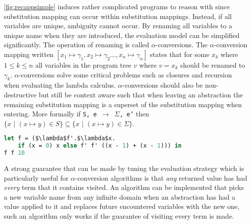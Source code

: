 \documentclass[11pt,oneside,a4paper]{report}
\begin{document}
\autoref{fig:recappsimple} induces rather complicated programs to reason with since substitution mapping can occur within substitution mappings.
Instead, if all variables are unique, ambiguity cannot occur.
By renaming all variables to a unique name when they are introduced, the evaluation model can be simplified significantly.
The operation of renaming is called $\alpha$-conversions.
The $\alpha$-conversion mapping written $[x_1 \mapsto \gamma_1, x_2 \mapsto \gamma_2 \dots , x_n \mapsto \gamma_n]$ states that for some $x_k$ where $1 \leq k \leq n$ all variables in the program tree $v$ where $v = x_k$ should be renamed to $\gamma_k$.
$\alpha$-conversions solve some critical problems such as closures and recursion when evaluating the lambda calculus.
$\alpha$-conversions should also be non-destructive but still be context aware such that when leaving an abstraction the remaining substitution mapping is a superset of the substitution mapping when entering.
More formally if \texttt{S, e $\rightarrow$ $\Sigma$, e'} then $\{x \,\,|\,\, (x \mapsto y) \in S\} \subseteq \{x \,\,|\,\, (x \mapsto y) \in \Sigma\}$.
\begin{lstlisting}[language=ML,caption={Recursive addition function},label={lst:recalpha},mathescape=true]
let f = ($\lambda$f'.$\lambda$x.
    if (x = 0) x else f' f' ((x - 1) + (x - 1))) in
f f 10
\end{lstlisting}
A strong guarantee that can be made by tuning the evaluation strategy which is particularly useful for $\alpha$-conversion algorithms is that \textit{any} returned value has had \textit{every} term that it contains visited.
An algorithm can be implemented that picks a new variable name from any infinite domain when an abstraction has had a value applied to it and replaces future encountered variables with the new one, such an algorithm only works if the guarantee of visiting every term is made.
\end{document}
